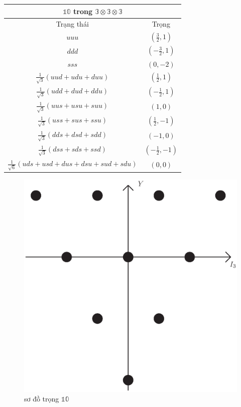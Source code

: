 \documentclass{report}
\begin{document}
	\begin{center}
		\begin{tabular}{ |c|c| }
			\hline
				\multicolumn{2}{|c|}{\( \mathbb{10} \) trong \( \mathbb{3} \otimes \mathbb{3} \otimes \mathbb{3} \)} \\
			\hline	
 				Trạng thái & Trọng \\
 			\hline
 				\( uuu \) & \( \left( \frac{3}{2}, 1 \right) \) \\ 	
			\hline
 				\( ddd \) & \( \left( - \frac{3}{2}, 1 \right) \) \\ 	
			\hline
				\( sss \) & \( \left( 0, - 2 \right) \) \\ 	
			\hline
				\( \frac{1}{\sqrt{3}} ( uud + udu + duu ) \) & \( \left( \frac{1}{2}, 1 \right) \) \\ 	
			\hline
				\( \frac{1}{\sqrt{3}} ( udd + dud + ddu ) \) & \( \left( - \frac{1}{2}, 1 \right) \) \\ 	
	
			\hline
				\( \frac{1}{\sqrt{3}} ( uus + usu + suu ) \) & \( \left( 1, 0 \right) \) \\ 	
			\hline
				\( \frac{1}{\sqrt{3}} ( uss + sus + ssu ) \) & \( \left( \frac{1}{2}, - 1 \right) \) \\ 	
			\hline
				\( \frac{1}{\sqrt{3}} ( dds + dsd + sdd ) \) & \( \left( - 1, 0 \right) \) \\ 	
			\hline
				\( \frac{1}{\sqrt{3}} ( dss + sds + ssd ) \) & \( \left( - \frac{1}{2}, - 1 \right) \) \\ 	
			\hline
				\( \frac{1}{\sqrt{6}} ( uds + usd + dus + dsu + sud + sdu ) \) & \( \left( 0, 0 \right) \) \\ 	
			\hline
		\end{tabular}
	\end{center}
	
	\begin{figure}[!htb]
		\centering
		\includegraphics[scale=0.4]{diagram8.eps}
		\caption{sơ đồ trọng \( \mathbb{10} \)}
	\end{figure}	
\end{document}
